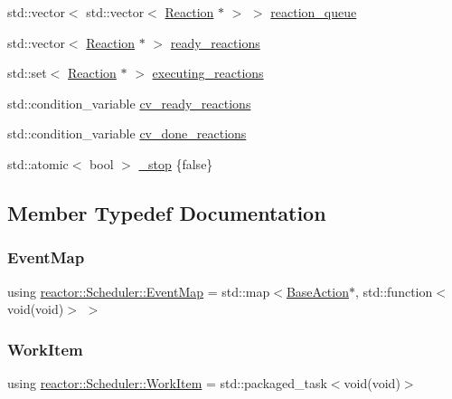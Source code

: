 \begin{DoxyCompactItemize}
std\+::vector$<$ std\+::vector$<$ \hyperlink{classreactor_1_1Reaction}{Reaction} $\ast$ $>$ $>$ \hyperlink{classreactor_1_1Scheduler_a65b74e5e2d64189fe30010140a2f8dad}{reaction\+\_\+queue}
\item 
std\+::vector$<$ \hyperlink{classreactor_1_1Reaction}{Reaction} $\ast$ $>$ \hyperlink{classreactor_1_1Scheduler_a03e5a171cbb041f02fd10fedf7f2f7de}{ready\+\_\+reactions}
\item 
std\+::set$<$ \hyperlink{classreactor_1_1Reaction}{Reaction} $\ast$ $>$ \hyperlink{classreactor_1_1Scheduler_a606c5c5af3e45a75b7304fdfd0283e14}{executing\+\_\+reactions}
\item 
std\+::condition\+\_\+variable \hyperlink{classreactor_1_1Scheduler_ae0b036e6af4ebf47f619bf6ac4b7120d}{cv\+\_\+ready\+\_\+reactions}
\item 
std\+::condition\+\_\+variable \hyperlink{classreactor_1_1Scheduler_a5ce0b7fa5a71eaf46b1d423c1ff90557}{cv\+\_\+done\+\_\+reactions}
\item 
std\+::atomic$<$ bool $>$ \hyperlink{classreactor_1_1Scheduler_a77d3790a2a37875efc1980ba55824561}{\+\_\+stop} \{false\}
\end{DoxyCompactItemize}


\subsection{Member Typedef Documentation}
\mbox{\label{classreactor_1_1Scheduler_aa32e06a71b7406a238616cc5d7b55610}} 
\subsubsection{\texorpdfstring{Event\+Map}{EventMap}}
{\footnotesize\ttfamily using \hyperlink{classreactor_1_1Scheduler_aa32e06a71b7406a238616cc5d7b55610}{reactor\+::\+Scheduler\+::\+Event\+Map} =  std\+::map$<$\hyperlink{classreactor_1_1BaseAction}{Base\+Action}$\ast$, std\+::function$<$void(void)$>$ $>$}

\mbox{\label{classreactor_1_1Scheduler_a5a4a25635fcb20f268876a0bf70eb68e}} 
\subsubsection{\texorpdfstring{Work\+Item}{WorkItem}}
{\footnotesize\ttfamily using \hyperlink{classreactor_1_1Scheduler_a5a4a25635fcb20f268876a0bf70eb68e}{reactor\+::\+Scheduler\+::\+Work\+Item} =  std\+::packaged\+\_\+task$<$void(void)$>$}

